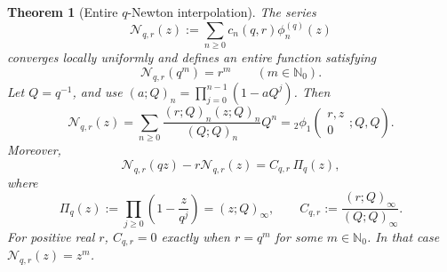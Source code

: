 \documentclass[11pt]{article}
\newtheorem{theorem}{Theorem}[section]
\theoremstyle{definition}
\newcommand{\Nzero}{\mathbb N_0}
\begin{document}
\begin{theorem}[Entire \(q\)-Newton interpolation]\label{thm:entire-q-newton}
The series
\begin{equation}\label{eq:entire-q-newton}
  \mathcal N_{q,r}(z)
   :=\sum_{n\ge0}c_n(q,r)\phi_n^{(q)}(z)
\end{equation}
converges locally uniformly and defines an entire function satisfying
\begin{equation}\label{eq:q-interpolation-infinite}
  \mathcal N_{q,r}(q^m)=r^m
  \qquad(m\in\Nzero).
\end{equation}
Let \(Q=q^{-1}\), and use \((a;Q)_n=\prod_{j=0}^{n-1}(1-aQ^j)\).  Then
\begin{equation}\label{eq:q-hypergeometric}
  \mathcal N_{q,r}(z)
   =\sum_{n\ge0}
    \frac{(r;Q)_n(z;Q)_n}{(Q;Q)_n}Q^n
   ={}_2\phi_1\!\left(\begin{matrix}r,z\\0\end{matrix};Q,Q\right).
\end{equation}
Moreover,
\begin{equation}\label{eq:q-newton-exact-defect}
  \mathcal N_{q,r}(qz)-r\mathcal N_{q,r}(z)
   =C_{q,r}\,\Pi_q(z),
\end{equation}
where
\begin{equation}\label{eq:q-product-and-constant}
  \Pi_q(z):=\prod_{j\ge0}\left(1-\frac{z}{q^j}\right)=(z;Q)_\infty,
  \qquad
  C_{q,r}:=\frac{(r;Q)_\infty}{(Q;Q)_\infty}.
\end{equation}
For positive real \(r\), \(C_{q,r}=0\) exactly when \(r=q^m\) for some \(m\in\Nzero\).  In that case \(\mathcal N_{q,r}(z)=z^m\).
\end{theorem}
\end{document}
